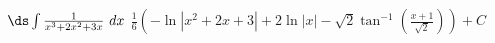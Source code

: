 {$\ds \int \frac{1}{x^3+2x^2+3x}\ dx$}
{$\frac{1}{6} \left(-\ln \left|x^2+2 x+3\right|+2 \ln |x|-\sqrt{2} \tan ^{-1}\left(\frac{x+1}{\sqrt{2}}\right)\right)+C$}

